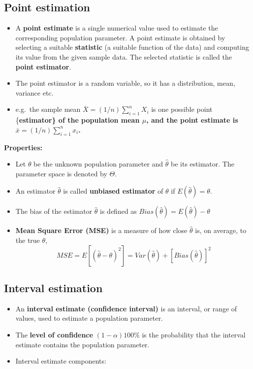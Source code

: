 \documentclass[
]{article}
\begin{document}
\hypertarget{point-estimation}{%
\subsection{Point estimation}\label{point-estimation}}

\begin{itemize}
\item
  A \textbf{point estimate} is a single numerical value used to estimate
  the corresponding population parameter. A point estimate is obtained
  by selecting a suitable \textbf{statistic} (a suitable function of the
  data) and computing its value from the given sample data. The selected
  statistic is called the \textbf{point estimator}.
\item
  The point estimator is a random variable, so it has a distribution,
  mean, variance etc.
\item
  e.g.~the sample mean \(\overline{X}=(1/n)\sum_{i=1}^{n}X_i\) is one
  possible point \{\bf estimator\} of the population mean \(\mu\), and
  the point \textbf{estimate} is \(\bar{x}=(1/n)\sum_{i=1}^{n}x_i\).
\end{itemize}

\textbf{Properties:}

\begin{itemize}
\item
  Let \(\theta\) be the unknown population parameter and
  \(\hat{\theta}\) be its estimator. The parameter space is denoted by
  \(\Theta\).
\item
  An estimator \(\hat{\theta}\) is called \textbf{unbiased estimator} of
  \(\theta\) if \(E( \hat{\theta}) = \theta\).
\item
  The bias of the estimator \(\hat{\theta}\) is defined as
  \(Bias(\hat{\theta})=E(\hat{\theta})-\theta\)
\item
  \textbf{Mean Square Error (MSE)} is a measure of how close
  \(\hat{\theta}\) is, on average, to the true \(\theta\),
  \[MSE=E[(\hat{\theta}-\theta)^2]= Var(\hat{\theta}) + [Bias (\hat{\theta})]^2\]
\end{itemize}

\hypertarget{interval-estimation}{%
\subsection{Interval estimation}\label{interval-estimation}}

\begin{itemize}
\item
  An \textbf{interval estimate (confidence interval)} is an interval, or
  range of values, used to estimate a population parameter.
\item
  The \textbf{level of confidence} \((1-\alpha)100\%\) is the
  probability that the interval estimate contains the population
  parameter.
\item
  Interval estimate components:
\end{itemize}
\end{document}
